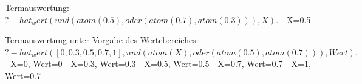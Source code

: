 \documentclass[a4paper]{article}
\begin{document}
\begin{multicols}{3}
  Termauswertung: -
  $?- hat_wert(und(atom(0.5),oder(atom(0.7),atom(0.3))),X).$ - X=0.5

  Termauswertung unter Vorgabe des Wertebereiches: -
  $?- hat_wert([0,0.3, 0.5, 0.7, 1], und(atom(X),oder(atom(0.5),atom(0.7))),Wert).$
  - X=0, Wert=0 - X=0.3, Wert=0.3 - X=0.5, Wert=0.5 - X=0.7, Wert=0.7 -
  X=1, Wert=0.7

\end{multicols}
\end{document}
